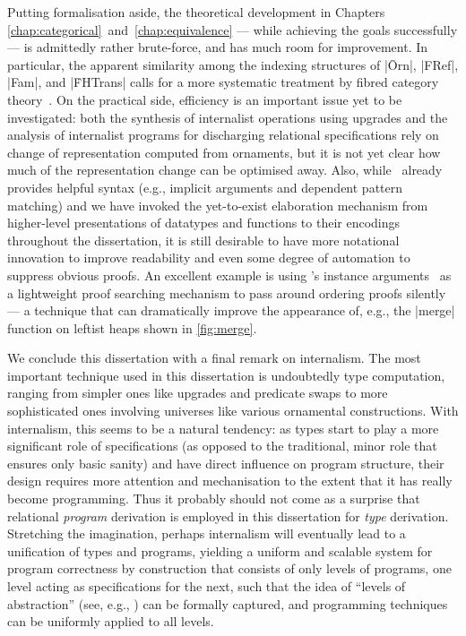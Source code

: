 Putting formalisation aside, the theoretical development in Chapters \ref{chap:categorical}~and~\ref{chap:equivalence} --- while achieving the goals successfully --- is admittedly rather brute-force, and has much room for improvement.
In particular, the apparent similarity among the indexing structures of |Ōrn|, |FRef|, |Fam|, and |ḞHTrans| calls for a more systematic treatment by fibred category theory~\citep{Jacobs-categorical-logic-and-type-theory}.
On the practical side, efficiency is an important issue yet to be investigated: both the synthesis of internalist operations using upgrades and the analysis of internalist programs for discharging relational specifications rely on change of representation computed from ornaments, but it is not yet clear how much of the representation change can be optimised away.
Also, while \Agda\ already provides helpful syntax (e.g., implicit arguments and dependent pattern matching) and we have invoked the yet-to-exist elaboration mechanism from higher-level presentations of datatypes and functions to their encodings throughout the dissertation, it is still desirable to have more notational innovation to improve readability and even some degree of automation to suppress obvious proofs.
An excellent example is  using \Agda's instance arguments~\citep{Devriese-instance-arguments} as a lightweight proof searching mechanism to pass around ordering proofs silently --- a technique that can dramatically improve the appearance of, e.g., the |merge| function on leftist heaps shown in \autoref{fig:merge}.

We conclude this dissertation with a final remark on internalism.
The most important technique used in this dissertation is undoubtedly type computation, ranging from simpler ones like upgrades and predicate swaps to more sophisticated ones involving universes like various ornamental constructions.
With internalism, this seems to be a natural tendency: as types start to play a more significant role of specifications (as opposed to the traditional, minor role that ensures only basic sanity) and have direct influence on program structure, their design requires more attention and mechanisation to the extent that it has really become programming.
Thus it probably should not come as a surprise that relational \emph{program} derivation is employed in this dissertation for \emph{type} derivation.
Stretching the imagination, perhaps internalism will eventually lead to a unification of types and programs, yielding a uniform and scalable system for program correctness by construction that consists of only levels of programs, one level acting as specifications for the next, such that the idea of ``levels of abstraction'' (see, e.g., \citet{Dijkstra-notes-on-structured-programming}) can be formally captured, and programming techniques can be uniformly applied to all levels.
